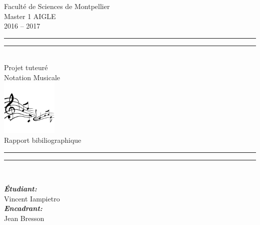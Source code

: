 \begin{titlepage}
\begin{center}
\begin{sffamily}

{\large
Faculté de Sciences de Montpellier \\[.5cm]
Master 1 AIGLE\\2016 -- 2017\\[2cm]
}


\rule{\textwidth}{1.6pt}\vspace*{-\baselineskip}\vspace*{2pt} 
\rule{\textwidth}{0.4pt}\\[\baselineskip]
{\LARGE
Projet tuteuré\\[0.7\baselineskip]
\Huge
Notation Musicale\\[0.7\baselineskip]
\includegraphics[width=0.2\textwidth]{Paratextes/i/logo.jpg}
\\[0.5\baselineskip]
Rapport bibiliographique
}\\[0.2\baselineskip] 
\rule{\textwidth}{0.4pt}\vspace*{-\baselineskip}\vspace{3.2pt}
\rule{\textwidth}{1.6pt}\\[\baselineskip]
\vspace*{2\baselineskip}

\noindent
\begin{center}
     \large
    \emph{\textbf{Étudiant:}}\\
    Vincent Iampietro \\
    \smallskip
    \large
    \emph{\textbf{Encadrant:}}\\
    Jean Bresson\\
\end{center}%



\end{sffamily}
\end{center}
\end{titlepage}